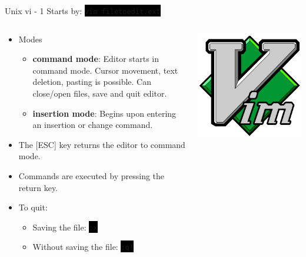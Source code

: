\documentclass[unknownkeysallowed, 10pt, a4 paper, handout]{beamer}
\newcommand{\code}[1]{\colorbox{black}{\color{green}\texttt{#1}}}
\begin{document}
\begin{frame}[label=vim1]{Unix vi - 1}
  Starts by: \code{vim filetoedit.ext}
  \begin{columns}[T]
    \begin{column}{.83\textwidth}
      \begin{itemize}
        \item Modes
        \begin{itemize}
           \item \textbf{command mode}: Editor starts in command mode.
              Cursor movement, text deletion, pasting is possible.
              Can close/open files, save and quit editor.
           \item \textbf{insertion mode}: Begins upon entering an insertion
              or change command.
        \end{itemize}
        \item The [ESC] key returns the editor to command mode.
        \item Commands are executed by pressing the return key.
        \item To quit:
        \begin{itemize}
           \item Saving the file: \code{:x}
           \item Without saving the file: \code{:q!}
        \end{itemize}
      \end{itemize}
    \end{column}
    \hfill
    \begin{column}{.25\textwidth}
      \includegraphics[scale=0.08]{pics/vim.png}
    \end{column}
  \end{columns}
\end{frame}
\end{document}
